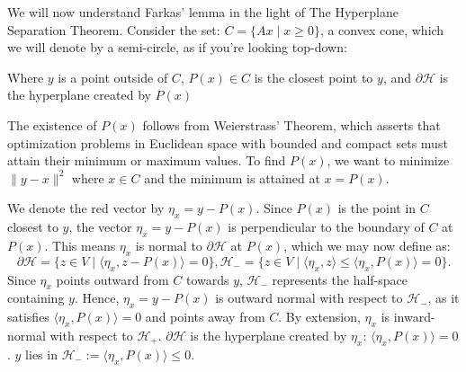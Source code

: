 \documentclass[11pt]{amsart} %
\theoremstyle{definition}
\begin{document}
We will now understand Farkas' lemma in the light of The Hyperplane Separation Theorem. Consider the set: \(C = \{ Ax \mid x \geq 0 \}\), a convex cone, which we will denote by a semi-circle, as if you're looking top-down:

\begin{center}
\end{center}

\begin{center}
    Where \(y\) is a point outside of \(C\), \(P(x) \in C\) is the closest point to \(y\), and \(\partial \mathcal{H}\) is the hyperplane created by \(P(x)\)
\end{center}

The existence of \(P(x)\) follows from Weierstrass' Theorem, which asserts that optimization problems in Euclidean space with bounded and compact sets must attain their minimum or maximum values. To find \(P(x)\), we want to minimize \(\|y - x\|^2\) where \(x \in C\) and the minimum is attained at \(x = P(x)\).

We denote the red vector by \(\eta_x = y - P(x)\). Since \(P(x)\) is the point in \(C\) closest to \(y\), the vector \(\eta_x = y - P(x)\) is perpendicular to the boundary of \(C\) at \(P(x)\). This means \(\eta_x\) is normal to \(\partial \mathcal{H}\) at \(P(x)\), which we may now define as:
    \[
    \partial \mathcal{H} = \{ z \in V \mid \langle \eta_x, z - P(x) \rangle = 0 \}, 
    \mathcal{H}_- = \{ z \in V \mid \langle \eta_x, z \rangle \leq \langle \eta_x, P(x) \rangle = 0 \}.
    \]
Since \(\eta_x\) points outward from \(C\) towards \(y\), \(\mathcal{H}_-\) represents the half-space containing \(y\). Hence, \(\eta_x = y - P(x)\) is outward normal with respect to \(\mathcal{H}_-\), as it satisfies \(\langle \eta_x, P(x) \rangle = 0\) and points away from \(C\). By extension, \(\eta_x\) is inward-normal with respect to \(\mathcal{H}_+\). \(\partial \mathcal{H}\) is the hyperplane created by \(\eta_x\): \(\langle \eta_x, P(x) \rangle = 0\). \(y\) lies in \(\mathcal{H}_-:= \langle \eta_x, P(x) \rangle \leq 0\).
\end{document}
